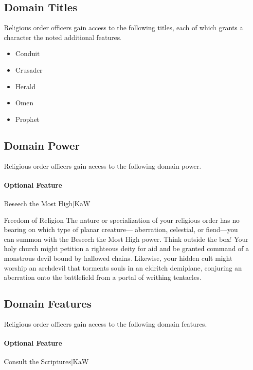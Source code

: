 \documentclass[10pt,a4paper,twoside,bg=print,twocolumn,openany,nodeprecatedcode]{dndbook}
\begin{document}
\subsection{Domain Titles}
Religious order officers gain access to the following titles, each of which grants a character the noted additional features.


\begin{itemize}
\item Conduit
\item Crusader
\item Herald
\item Omen
\item Prophet
\end{itemize}

\subsection{Domain Power}
Religious order officers gain access to the following domain power.

\paragraph{Optional Feature}
Beseech the Most High|KaW

\begin{DndSidebar}[float=!b]{Freedom of Religion}
The nature or specialization of your religious order has no bearing on which type of planar creature— aberration, celestial, or fiend—you can summon with the Beseech the Most High power. Think outside the box! Your holy church might petition a righteous deity for aid and be granted command of a monstrous devil bound by hallowed chains. Likewise, your hidden cult might worship an archdevil that torments souls in an eldritch demiplane, conjuring an aberration onto the battlefield from a portal of writhing tentacles.



\end{DndSidebar}

\subsection{Domain Features}
Religious order officers gain access to the following domain features.

\paragraph{Optional Feature}
Consult the Scriptures|KaW
\end{document}
